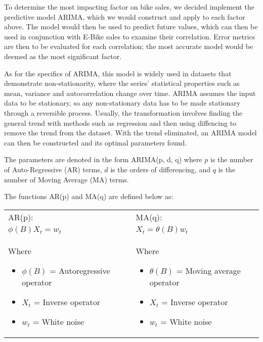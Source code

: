 To determine the most impacting factor on bike sales, we decided implement the predictive model ARIMA, which we would construct and apply to each factor above.
The model would then be used to predict future values, which can then be used in conjunction with E-Bike sales to examine their correlation. Error metrics are then
to be evaluated for each correlation; the most accurate model would be deemed as the most significant factor.

As for the specifics of ARIMA, this model is widely used in datasets that demonstrate non-stationarity, where the series' statistical properties such as
mean, variance and autocorrelation change over time. ARIMA assumes the input data to
be stationary, so any non-stationary data has to be made stationary through a reversible
process. Usually, the transformation involves finding the general trend with methods such as
regression and then using diffencing to remove the trend from the dataset. With the trend
eliminated, an ARIMA model can then be constructed and its optimal parameters found.

The parameters are denoted in the form ARIMA(p, d, q) where $p$ is the
number of Auto-Regressive (AR) terms, $d$ is the orders of differencing, and $q$ is the number
of Moving Average (MA) terms.

The functions AR(p) and MA(q) are defined below as:


\begin{tabular}{|*2{p{}|}}
    \hline
    AR(p):                       & MA(q):                   \\
    \quad ${\phi (B) X_t = w_t}$ & ${X_t = \theta (B) w_t}$ \\[\baselineskip]
    Where
    \begin{itemize}[nosep]
        \item ${\phi (B)}$ = Autoregressive operator
        \item ${X_t}$ = Inverse operator
        \item ${w_t}$ = White noise
    \end{itemize}
    &
    Where
    \begin{itemize}[nosep]
        \item ${\theta (B)}$ = Moving average operator
        \item ${X_t}$ = Inverse operator
        \item ${w_t}$ = White noise
    \end{itemize}
    \\
    \hline
\end{tabular}

